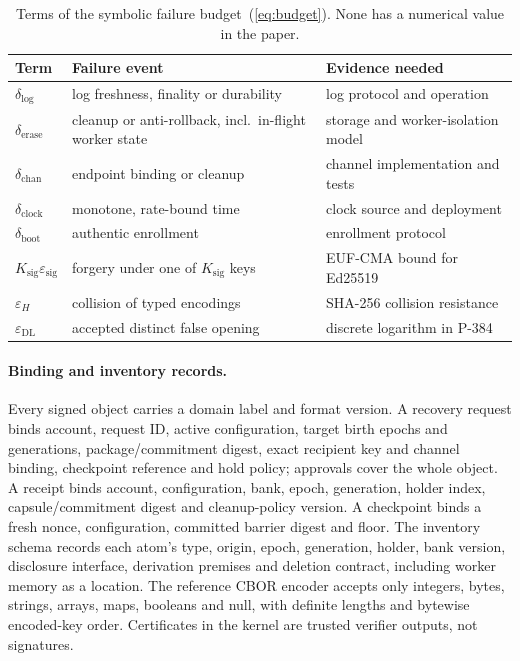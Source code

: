 \documentclass[pdflatex,sn-mathphys-num]{sn-jnl}
\theoremstyle{plain}
\begin{document}
\begin{table}[htbp]
\caption{Terms of the symbolic failure budget~(\ref{eq:budget}). None has a numerical value in the paper.}\label{tab:budget}
\centering\footnotesize
\begin{tabularx}{\linewidth}{@{}>{\raggedright\arraybackslash}p{.17\linewidth}>{\raggedright\arraybackslash}p{.38\linewidth}Y@{}}\toprule
Term & Failure event & Evidence needed\\\midrule
$\delta_{\mathrm{log}}$ & log freshness, finality or durability & log protocol and operation\\
$\delta_{\mathrm{erase}}$ & cleanup or anti-rollback, incl.\ in-flight worker state & storage and worker-isolation model\\
$\delta_{\mathrm{chan}}$ & endpoint binding or cleanup & channel implementation and tests\\
$\delta_{\mathrm{clock}}$ & monotone, rate-bound time & clock source and deployment\\
$\delta_{\mathrm{boot}}$ & authentic enrollment & enrollment protocol\\
$K_{\mathrm{sig}}\varepsilon_{\mathrm{sig}}$ & forgery under one of $K_{\mathrm{sig}}$ keys & EUF-CMA bound for Ed25519\\
$\varepsilon_H$ & collision of typed encodings & SHA-256 collision resistance\\
$\varepsilon_{\mathrm{DL}}$ & accepted distinct false opening & discrete logarithm in P-384\\\bottomrule
\end{tabularx}
\end{table}

\paragraph{Binding and inventory records.}
Every signed object carries a domain label and format version. A recovery request binds account, request ID, active configuration, target birth epochs and generations, package/commitment digest, exact recipient key and channel binding, checkpoint reference and hold policy; approvals cover the whole object. A receipt binds account, configuration, bank, epoch, generation, holder index, capsule/commitment digest and cleanup-policy version. A checkpoint binds a fresh nonce, configuration, committed barrier digest and floor. The inventory schema records each atom's type, origin, epoch, generation, holder, bank version, disclosure interface, derivation premises and deletion contract, including worker memory as a location. The reference CBOR encoder accepts only integers, bytes, strings, arrays, maps, booleans and null, with definite lengths and bytewise encoded-key order. Certificates in the kernel are trusted verifier outputs, not signatures.
\end{document}

